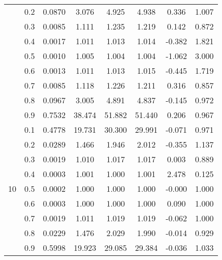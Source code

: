 \documentclass[11pt,a4paper]{report}
\begin{document}
\begin{longtable}{ | c | c || c | c | c | c | c | c | }
 & 0.2 & 0.0870 & 3.076 & 4.925 & 4.938 & 0.336 & 1.007 \\
 & 0.3 & 0.0085 & 1.111 & 1.235 & 1.219 & 0.142 & 0.872 \\
 & 0.4 & 0.0017 & 1.011 & 1.013 & 1.014 & -0.382 & 1.821 \\
 & 0.5 & 0.0010 & 1.005 & 1.004 & 1.004 & -1.062 & 3.000 \\
 & 0.6 & 0.0013 & 1.011 & 1.013 & 1.015 & -0.445 & 1.719 \\
 & 0.7 & 0.0085 & 1.118 & 1.226 & 1.211 & 0.316 & 0.857 \\
 & 0.8 & 0.0967 & 3.005 & 4.891 & 4.837 & -0.145 & 0.972 \\
 & 0.9 & 0.7532 & 38.474 & 51.882 & 51.440 & 0.206 & 0.967 \\
 \hline
\multirow{9}{*}{10} & 0.1 & 0.4778 & 19.731 & 30.300 & 29.991 & -0.071 & 0.971 \\
 & 0.2 & 0.0289 & 1.466 & 1.946 & 2.012 & -0.355 & 1.137 \\
 & 0.3 & 0.0019 & 1.010 & 1.017 & 1.017 & 0.003 & 0.889 \\
 & 0.4 & 0.0003 & 1.001 & 1.000 & 1.001 & 2.478 & 0.125 \\
 & 0.5 & 0.0002 & 1.000 & 1.000 & 1.000 & -0.000 & 1.000 \\
 & 0.6 & 0.0003 & 1.000 & 1.000 & 1.000 & 0.090 & 1.000 \\
 & 0.7 & 0.0019 & 1.011 & 1.019 & 1.019 & -0.062 & 1.000 \\
 & 0.8 & 0.0229 & 1.476 & 2.029 & 1.990 & -0.014 & 0.929 \\
 & 0.9 & 0.5998 & 19.923 & 29.085 & 29.384 & -0.036 & 1.033 \\
 \hline
\hline
\end{longtable}
\end{document}
